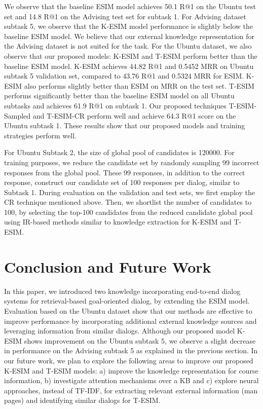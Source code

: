 \documentclass[letterpaper]{article} %
\begin{document}
We observe that the baseline ESIM model achieves 50.1 R@1 on the Ubuntu test set and 14.8 R@1 on the Advising test set for subtask 1. For Advising dataset subtask 5, we observe that the K-ESIM model performance is slightly below the baseline ESIM model. We believe that our external knowledge representation for the Advising dataset is not suited for the task. For the Ubuntu dataset, we also observe that our proposed models: K-ESIM and T-ESIM perform better than the baseline ESIM model. K-ESIM achieves 44.82 R@1 and 0.5452 MRR on Ubuntu subtask 5 validation set, compared to 43.76 R@1 and 0.5324 MRR for ESIM. K-ESIM also performs slightly better than ESIM on MRR on the test set. T-ESIM performs significantly better than the baseline ESIM model on all Ubuntu subtasks and achieves 61.9 R@1 on subtask 1. Our proposed techniques T-ESIM-Sampled and T-ESIM-CR perform well and achieve 64.3 R@1 score on the Ubuntu subtask 1. These results show that our proposed models and training strategies perform well.

For Ubuntu Subtask 2, the size of global pool of candidates is 120000. For training purposes, we reduce the candidate set by randomly sampling 99 incorrect responses from the global pool. These 99 responses, in addition to the correct response, construct our candidate set of 100 responses per dialog, similar to Subtask 1. During evaluation on the validation and test sets, we first employ the CR technique mentioned above. Then, we shortlist the number of candidates to 100, by selecting the top-100 candidates from the reduced candidate global pool using IR-based methods similar to knowledge extraction for K-ESIM and T-ESIM.

\section{Conclusion and Future Work}
In this paper, we introduced two knowledge incorporating end-to-end dialog systems for retrieval-based goal-oriented dialog, by extending the ESIM model. Evaluation based on the Ubuntu dataset show that our methods are effective to improve performance by incorporating additional external knowledge sources and leveraging information from similar dialogs. Although our proposed model K-ESIM shows improvement on the Ubuntu subtask 5, we observe a slight decrease in performance on the Advising subtask 5 as explained in the previous section.  In our future work, we plan to explore the following areas to improve our proposed K-ESIM and T-ESIM models: a) improve the knowledge representation for course information, b) investigate attention mechanisms over a KB \cite{eric2017key} and c) explore neural approaches, instead of TF-IDF, for extracting relevant external information (man pages) and identifying similar dialogs for T-ESIM.
\end{document}
